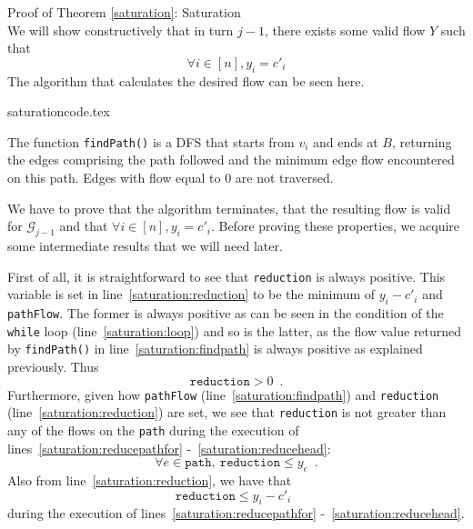 \begin{sepproof}{Proof of Theorem \ref{saturation}: Saturation} \ \\
  We will show constructively that in turn $j-1$, there exists some valid flow $Y$ such that
  \begin{equation}
  \label{saturation:target}
    \forall i \in [n], y_i = c'_i
  \end{equation}
  The algorithm that calculates the desired flow can be seen here.

  {saturationcode.tex}

  The function \texttt{findPath()} is a DFS that starts from $v_i$ and ends at $B$, returning the edges comprising the path
  followed and the minimum edge flow encountered on this path. Edges with flow equal to 0 are not traversed.

  We have to prove that the algorithm terminates, that the resulting flow is valid for $\mathcal{G}_{j-1}$ and that $\forall i
  \in [n], y_i = c'_i$. Before proving these properties, we acquire some intermediate results that we will need later.
  
  First of all, it is straightforward to see that \texttt{reduction} is always positive. This variable is set in
  line~\ref{saturation:reduction} to be the minimum of $y_i - c'_i$ and \texttt{pathFlow}. The former is always positive
  as can be seen in the condition of the \texttt{while} loop (line~\ref{saturation:loop}) and so is the latter, as the flow
  value returned by \texttt{findPath()} in line~\ref{saturation:findpath} is always positive as explained previously. Thus
  \begin{equation}
  \label{reductionpos}
    \texttt{reduction} > 0 \enspace.
  \end{equation}
  Furthermore, given how \texttt{pathFlow} (line~\ref{saturation:findpath}) and \texttt{reduction}
  (line~\ref{saturation:reduction}) are set, we see that \texttt{reduction} is not greater than any of the flows on the
  \texttt{path} during the execution of lines~\ref{saturation:reducepathfor} -~\ref{saturation:reducehead}:
  \begin{equation}
  \label{reductionsmalle}
    \forall e \in \texttt{path}, \: \texttt{reduction} \leq y_e \enspace.
  \end{equation}
  Also from line~\ref{saturation:reduction}, we have that
  \begin{equation}
  \label{reductionsmalli}
    \texttt{reduction} \leq y_i - c'_i \enspace
  \end{equation}
  during the execution of lines~\ref{saturation:reducepathfor} -~\ref{saturation:reducehead}.


\end{sepproof}

